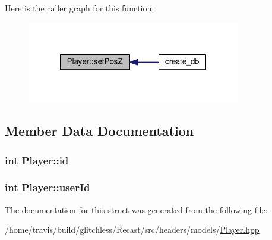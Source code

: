Here is the caller graph for this function\-:
\nopagebreak
\begin{figure}[H]
\begin{center}
\leavevmode
\includegraphics[width=264pt]{struct_player_a265ea0b3d9627fb6f9e65dfb3aed66f7_icgraph}
\end{center}
\end{figure}




\subsection{Member Data Documentation}
\hypertarget{struct_player_a05e05f3a23de78da7ec032ec2bcf8c6c}{
\subsubsection[{id}]{\setlength{\rightskip}{0pt plus 5cm}int Player\-::id}}\label{struct_player_a05e05f3a23de78da7ec032ec2bcf8c6c}
\hypertarget{struct_player_a5c801c5fa6666baddd65a2863cc6e7f2}{
\subsubsection[{user\-Id}]{\setlength{\rightskip}{0pt plus 5cm}int Player\-::user\-Id}}\label{struct_player_a5c801c5fa6666baddd65a2863cc6e7f2}


The documentation for this struct was generated from the following file\-:\begin{DoxyCompactItemize}
\item 
/home/travis/build/glitchless/\-Recast/src/headers/models/\hyperlink{_player_8hpp}{Player.\-hpp}\end{DoxyCompactItemize}
